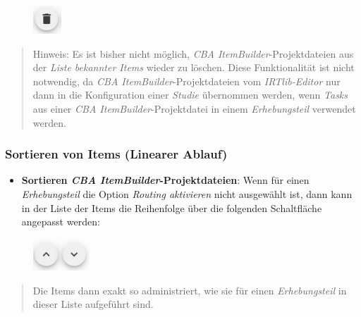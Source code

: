 \documentclass[
  letterpaper,
  DIV=11]{scrreprt}
\providecommand{\tightlist}{%
  \setlength{\itemsep}{0pt}\setlength{\parskip}{0pt}}\usepackage{longtable,booktabs,array}
\begin{document}
\begin{tcolorbox}
\begin{figure}[H]

\includegraphics[width=0.41667in,height=\textheight]{img/screenshot-delete-item-icon-01.png} \hfill{}

\end{figure}

\begin{quote}
Hinweis: Es ist bisher nicht möglich, \emph{CBA
ItemBuilder}-Projektdateien aus der \emph{Liste bekannter Items} wieder
zu löschen. Diese Funktionalität ist nicht notwendig, da \emph{CBA
ItemBuilder}-Projektdateien vom \emph{IRTlib-Editor} nur dann in die
Konfiguration einer \emph{Studie} übernommen werden, wenn \emph{Tasks}
aus einer \emph{CBA ItemBuilder}-Projektdatei in einem
\emph{Erhebungsteil} verwendet werden.
\end{quote}

\hypertarget{sortieren-von-items-linearer-ablauf-1}{%
\subsubsection{Sortieren von Items (Linearer
Ablauf)}\label{sortieren-von-items-linearer-ablauf-1}}

\begin{itemize}
\tightlist
\item
  \textbf{Sortieren \emph{CBA ItemBuilder}-Projektdateien}: Wenn für
  einen \emph{Erhebungsteil} die Option \emph{Routing aktivieren} nicht
  ausgewählt ist, dann kann in der Liste der Items die Reihenfolge über
  die folgenden Schaltfläche angepasst werden:
\end{itemize}

\begin{figure}[H]

\includegraphics[width=0.83333in,height=\textheight]{img/screenshot-sort-items-icon-01.png} \hfill{}

\end{figure}

\begin{quote}
Die Items dann exakt so administriert, wie sie für einen
\emph{Erhebungsteil} in dieser Liste aufgeführt sind.
\end{quote}


\end{tcolorbox}
\end{document}
